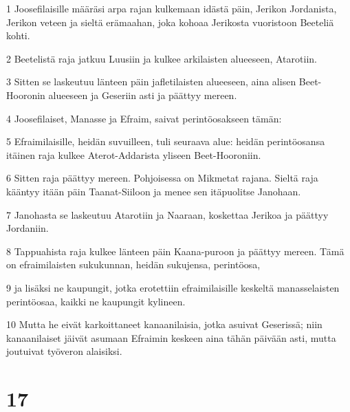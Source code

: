 \par 1 Joosefilaisille määräsi arpa rajan kulkemaan idästä päin, Jerikon Jordanista, Jerikon veteen ja sieltä erämaahan, joka kohoaa Jerikosta vuoristoon Beeteliä kohti.
\par 2 Beetelistä raja jatkuu Luusiin ja kulkee arkilaisten alueeseen, Atarotiin.
\par 3 Sitten se laskeutuu länteen päin jafletilaisten alueeseen, aina alisen Beet-Hooronin alueeseen ja Geseriin asti ja päättyy mereen.
\par 4 Joosefilaiset, Manasse ja Efraim, saivat perintöosakseen tämän:
\par 5 Efraimilaisille, heidän suvuilleen, tuli seuraava alue: heidän perintöosansa itäinen raja kulkee Aterot-Addarista yliseen Beet-Hooroniin.
\par 6 Sitten raja päättyy mereen. Pohjoisessa on Mikmetat rajana. Sieltä raja kääntyy itään päin Taanat-Siiloon ja menee sen itäpuolitse Janohaan.
\par 7 Janohasta se laskeutuu Atarotiin ja Naaraan, koskettaa Jerikoa ja päättyy Jordaniin.
\par 8 Tappuahista raja kulkee länteen päin Kaana-puroon ja päättyy mereen. Tämä on efraimilaisten sukukunnan, heidän sukujensa, perintöosa,
\par 9 ja lisäksi ne kaupungit, jotka erotettiin efraimilaisille keskeltä manasselaisten perintöosaa, kaikki ne kaupungit kylineen.
\par 10 Mutta he eivät karkoittaneet kanaanilaisia, jotka asuivat Geserissä; niin kanaanilaiset jäivät asumaan Efraimin keskeen aina tähän päivään asti, mutta joutuivat työveron alaisiksi.

\chapter{17}

